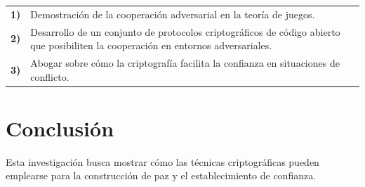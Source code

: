 \documentclass[conference]{IEEEtran}
\begin{document}
\begin{tabular}{lp{210pt}}
    {\small \textbf{1)}} & {\small Demostración de la cooperación adversarial en la teoría de juegos.} \\
    {\small \textbf{2)}} & {\small Desarrollo de un conjunto de protocolos criptográficos de código abierto que posibiliten la cooperación en entornos adversariales.} \\
    {\small \textbf{3)}} & {\small Abogar sobre cómo la criptografía facilita la confianza en situaciones de conflicto.}
\end{tabular}

\vspace{10pt}
\section{Conclusión}
Esta investigación busca mostrar cómo las técnicas criptográficas pueden emplearse para la construcción de paz y el establecimiento de confianza. 








% 
% 
\end{document}
